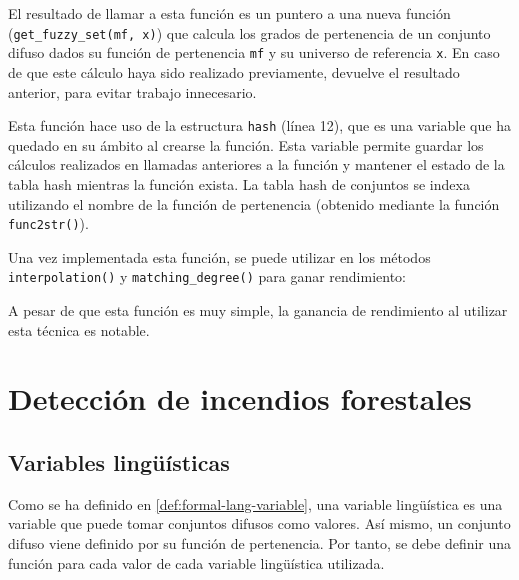 

El resultado de llamar a esta función es un puntero a una nueva función (\lstinline|get_fuzzy_set(mf, x)|) que calcula los grados de pertenencia de un conjunto difuso dados su función de pertenencia \lstinline|mf| y su universo de referencia \lstinline|x|. En caso de que este cálculo haya sido realizado previamente, devuelve el resultado anterior, para evitar trabajo innecesario. 

Esta función hace uso de la estructura \lstinline|hash| (línea 12), que es una variable que ha quedado en su ámbito al crearse la función. Esta variable permite guardar los cálculos realizados en llamadas anteriores a la función y mantener el estado de la tabla hash mientras la función exista. La tabla hash de conjuntos se indexa utilizando el nombre de la función de pertenencia (obtenido mediante la función \lstinline|func2str()|).

Una vez implementada esta función, se puede utilizar en los métodos \lstinline|interpolation()| y \lstinline|matching_degree()| para ganar rendimiento:





A pesar de que esta función es muy simple, la ganancia de rendimiento al utilizar esta técnica es notable.
 
\section{Detección de incendios forestales}
\subsection{Variables lingüísticas}
Como se ha definido en \ref{def:formal-lang-variable}, una variable lingüística es una variable que puede tomar conjuntos difusos como valores. Así mismo, un conjunto difuso viene definido por su función de pertenencia. Por tanto, se debe definir una función para cada valor de cada variable lingüística utilizada. 

